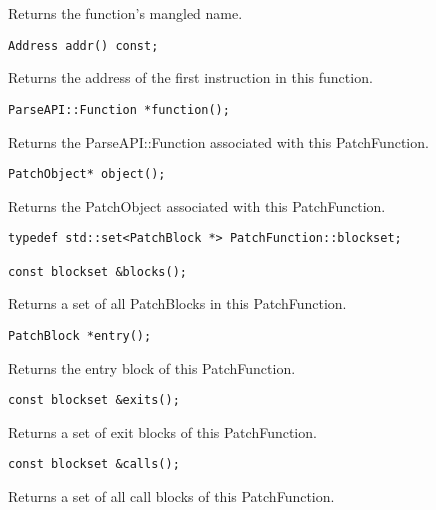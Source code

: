 Returns the function's mangled name.


\begin{verbatim}
Address addr() const;

\end{verbatim}



Returns the address of the first instruction in this function.


\begin{verbatim}
ParseAPI::Function *function();

\end{verbatim}



Returns the ParseAPI::Function associated with this PatchFunction.


\begin{verbatim}
PatchObject* object();

\end{verbatim}



Returns the PatchObject associated with this PatchFunction.


\begin{verbatim}
typedef std::set<PatchBlock *> PatchFunction::blockset;

const blockset &blocks();

\end{verbatim}



Returns a set of all PatchBlocks in this PatchFunction.


\begin{verbatim}
PatchBlock *entry();

\end{verbatim}



Returns the entry block of this PatchFunction.


\begin{verbatim}
const blockset &exits();

\end{verbatim}



Returns a set of exit blocks of this PatchFunction.


\begin{verbatim}
const blockset &calls();

\end{verbatim}



Returns a set of all call blocks of this PatchFunction.


